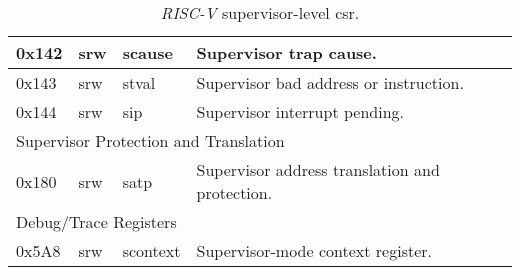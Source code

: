 \begin{table}[!ht]
\begin{tabular}{|llll|}
  \multicolumn{1}{|l|}{0x142}           & \multicolumn{1}{l|}{\acrshort{srw}}                & \multicolumn{1}{l|}{scause}        & Supervisor trap cause.                         \\ \hline
  \multicolumn{1}{|l|}{0x143}           & \multicolumn{1}{l|}{\acrshort{srw}}                & \multicolumn{1}{l|}{stval}         & Supervisor bad address or instruction.         \\ \hline
  \multicolumn{1}{|l|}{0x144}           & \multicolumn{1}{l|}{\acrshort{srw}}                & \multicolumn{1}{l|}{sip}           & Supervisor interrupt pending.                  \\ \hline
  \multicolumn{4}{|l|}{Supervisor Protection and Translation}                                                                                                           \\ \hline
  \multicolumn{1}{|l|}{0x180}           & \multicolumn{1}{l|}{\acrshort{srw}}                & \multicolumn{1}{l|}{satp}          & Supervisor address translation and protection. \\ \hline
  \multicolumn{4}{|l|}{Debug/Trace Registers}                                                                                                                           \\ \hline
  \multicolumn{1}{|l|}{0x5A8}           & \multicolumn{1}{l|}{\acrshort{srw}}                & \multicolumn{1}{l|}{scontext}      & Supervisor-mode context register.              \\ \hline
  \end{tabular}
  \caption{\textit{RISC-V} supervisor-level \acrshort{csr}.}
  \label{tab:supervisor_csr}
\end{table}

